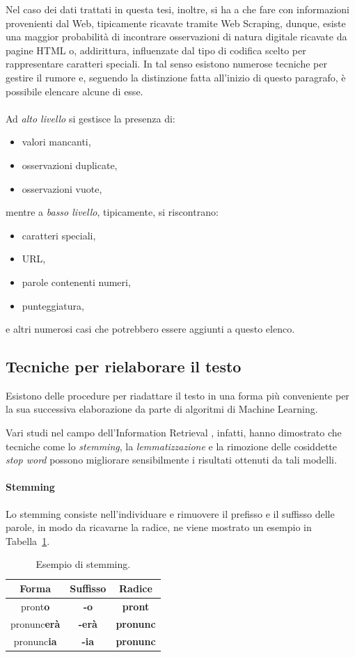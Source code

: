 \documentclass[12pt]{report}
\theoremstyle{definition}
\begin{document}
Nel caso dei dati trattati in questa tesi, inoltre, si ha a che fare con informazioni provenienti dal Web, tipicamente ricavate tramite Web Scraping, dunque, esiste una maggior probabilità di incontrare osservazioni di natura digitale ricavate da pagine HTML o, addirittura, influenzate dal tipo di codifica scelto per rappresentare caratteri speciali.
In tal senso esistono numerose tecniche per gestire il rumore e, seguendo la distinzione fatta all'inizio di questo paragrafo, è possibile elencare alcune di esse.
\\
\\
Ad \textit{alto livello} si gestisce la presenza di:
\begin{itemize}
    \item valori mancanti,
    \item osservazioni duplicate,
    \item osservazioni vuote,
\end{itemize}

mentre a \textit{basso livello}, tipicamente, si riscontrano:
\begin{itemize}
    \item caratteri speciali,
    \item URL,
    \item parole contenenti numeri,
    \item punteggiatura,
\end{itemize}

e altri numerosi casi che potrebbero essere aggiunti a questo elenco.
\subsection{Tecniche per rielaborare il testo}
Esistono delle procedure per riadattare il testo in una forma più conveniente per la sua successiva elaborazione da parte di algoritmi di Machine Learning.

Vari studi nel campo dell'Information Retrieval \cite{22}, infatti, hanno dimostrato che tecniche come lo \textit{stemming}, la \textit{lemmatizzazione} e la rimozione delle cosiddette \textit{stop word} possono migliorare sensibilmente i risultati ottenuti da tali modelli.

\paragraph{Stemming} Lo stemming consiste nell'individuare e rimuovere il prefisso e il suffisso delle parole, in modo da ricavarne la radice, ne viene mostrato un esempio in Tabella~\ref{stemming}.
\begin{table}
\centering
 \begin{tabular}{|c|c|c|} 
 \hline 
 \textbf{Forma} & \textbf{Suffisso} & \textbf{Radice}
\\ [0.5ex] 
\hline
pront\textbf{o} & \textbf{-o} & \textbf{pront} \\
pronunc\textbf{erà} & \textbf{-erà} & \textbf{pronunc} \\
pronunc\textbf{ia} & \textbf{-ia} & \textbf{pronunc} \\
 \hline
\end{tabular}
\caption{Esempio di stemming.}
\label{stemming}
\end{table}
\end{document}
